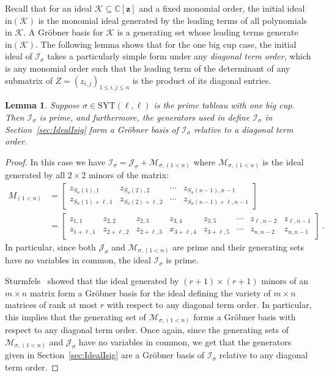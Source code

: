\documentclass[11pt]{amsart}
\newtheorem{lemma}[theorem]{Lemma}
\theoremstyle{remark}
\theoremstyle{remark}
\theoremstyle{definition}
\theoremstyle{definition}
\theoremstyle{definition}
\numberwithin{equation}{section}
\newcommand{\C}{\mathbb{C}}           %
\newcommand{\gs}{\sigma}
\newcommand{\ci}{\mathcal{I}}
\newcommand{\cj}{\mathcal{J}}
\newcommand{\cm}{\mathcal{M}}
\newcommand{\SYT}{\mathrm{SYT}}
\newcommand{\isigma}{\ci_\gs}
\begin{document}
Recall that for an ideal $\mathcal{K} \subseteq \C[\mathbf{z}]$ and a fixed monomial order, the initial ideal $\mathrm{in}(\mathcal{K})$ is the monomial ideal generated by the leading terms of all polynomials in $\mathcal{K}$. A Gr\"obner basis for $\mathcal{K}$ is a generating set whose leading terms generate $\mathrm{in}(\mathcal{K})$. The following lemma shows that for the one big cup case, the initial ideal of $\isigma$ takes a particularly simple form under any \emph{diagonal term order}, which is any monomial order such that the leading term of the determinant of any submatrix of $Z =(z_{i,j})_{1 \leq i,j \leq n}$ is the product of its diagonal entries. 


\begin{lemma}\label{lemma.Grobner} Suppose $\gs\in \SYT(\ell,\ell)$ is the prime tableau with one big cup. Then $\ci_\gs$ is prime, and furthermore, the generators used in define $\ci_\gs$ in Section~\ref{sec:IdealIsig} form a Gr\"obner basis of $\ci_\gs$ relative to a diagonal term order. 
\end{lemma}
\begin{proof}  In this case we have $\ci_\gs = \cj_\gs+\cm_{\gs, (1<n)}$ where $\cm_{\gs,(1<n)}$ is the ideal generated by all $2\times 2$ minors of the matrix:
\begin{align*}
M_{(1<n)} &= \begin{bmatrix} z_{S_\gs(1), 1} & z_{S_{\gs}(2), 2} & \cdots & z_{S_{\gs}(n-1), n-1}  \\
z_{S_\gs(1)+\ell, 1} & z_{S_{\gs}(2)+\ell, 2} & \cdots & z_{S_{\gs}(n-1)+\ell, n-1} 
\end{bmatrix} \\
&=  \begin{bmatrix} z_{1, 1} & z_{2, 2} & z_{2, 3} & z_{3,4} & z_{3,5} & \cdots & z_{\ell, n-2} & z_{\ell, n-1}  \\
z_{1+\ell, 1} & z_{2+\ell, 2} & z_{2+\ell, 3} & x_{3+\ell, 4} & z_{3+\ell, 5} & \cdots & z_{n, n-2} & z_{n, n-1} 
\end{bmatrix} \ .
\end{align*}
In particular, since both $\cj_\gs$ and $\cm_{\gs, (1<n)}$ are prime and their generating sets have no variables in common, the ideal $\isigma$ is prime. 


Sturmfels~\cite[Theorem 1]{Sturmfels1990} showed that the ideal generated by $(r+1)\times(r+1)$ minors of an $m\times n$ matrix form a Gr\"obner basis for the ideal defining the variety of $m\times n$ matrices of rank at most $r$ with respect to any diagonal term order. In particular, this implies that the generating set of $\cm_{\gs,(1<n)}$ forms a Gr\"obner basis with respect to any diagonal term order. Once again, since the generating sets of $\cm_{\gs,(1<n)}$ and $\cj_\gs$ have no variables in common, we get that the generators given in Section~\ref{sec:IdealIsig} are a Gr\"obner basis of $\ci_\gs$ relative to any diagonal term order. 
\end{proof}
\end{document}
